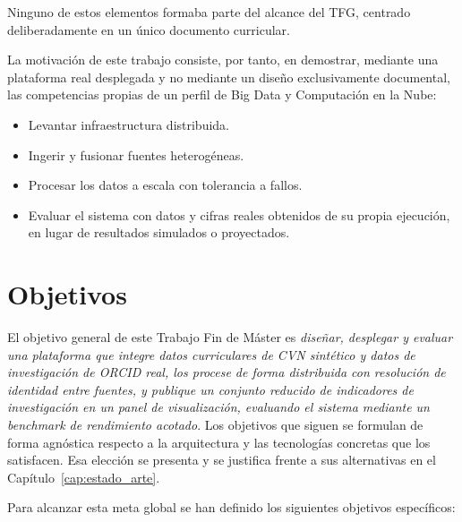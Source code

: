 Ninguno de estos elementos formaba parte del alcance del TFG, centrado
deliberadamente en un único documento curricular.

La motivación de este trabajo consiste, por tanto, en demostrar, mediante
una plataforma real desplegada y no mediante un diseño exclusivamente
documental, las competencias propias de un perfil de Big Data y
Computación en la Nube:

\begin{itemize}
  \item Levantar infraestructura distribuida.
  \item Ingerir y fusionar fuentes heterogéneas.
  \item Procesar los datos a escala con tolerancia a fallos.
  \item Evaluar el sistema con datos y cifras reales obtenidos de su
  propia ejecución, en lugar de resultados simulados o proyectados.
\end{itemize}

\section{Objetivos}
\label{sec:introduccion_objetivos}

El objetivo general de este Trabajo Fin de Máster es \textit{diseñar,
desplegar y evaluar una plataforma que integre datos curriculares de CVN
sintético y datos de investigación de ORCID real, los procese de forma
distribuida con resolución de identidad entre fuentes, y publique un
conjunto reducido de indicadores de investigación en un panel de
visualización, evaluando el sistema mediante un \textit{benchmark} de
rendimiento acotado}. Los objetivos que siguen se formulan de forma
agnóstica respecto a la arquitectura y las tecnologías concretas que los
satisfacen. Esa elección se presenta y se justifica frente a sus
alternativas en el Capítulo~\ref{cap:estado_arte}.

Para alcanzar esta meta global se han definido los siguientes objetivos
específicos:

